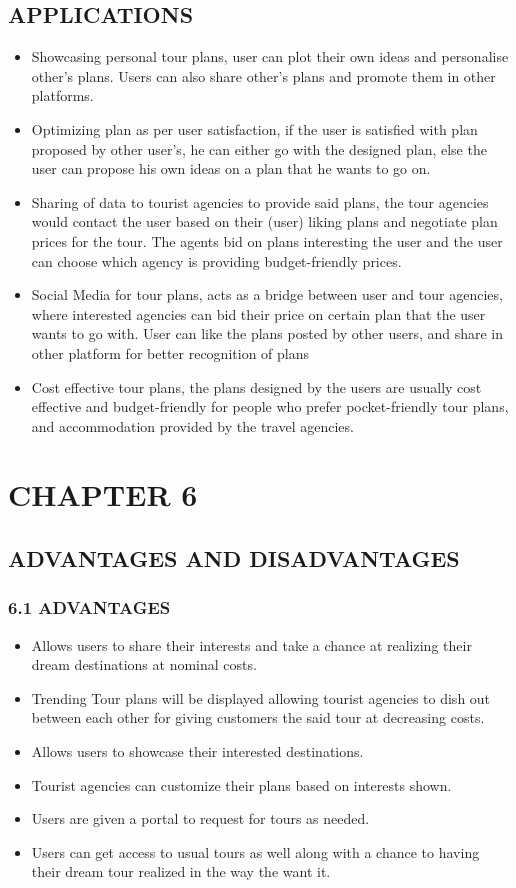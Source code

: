 \documentclass[12pt,a4paper]{article}
\begin{document}
\subsection*{\protect \centering APPLICATIONS}
\begin{itemize}
	\item Showcasing personal tour plans, user can plot their own ideas and personalise
	other’s plans. Users can also share other’s plans and promote them in other platforms.
	\item Optimizing plan as per user satisfaction, if the user is satisfied with plan proposed
	by other user’s, he can either go with the designed plan, else the user can propose his
	own ideas on a plan that he wants to go on.
	\item Sharing of data to tourist agencies to provide said plans, the tour agencies would
	contact the user based on their (user) liking plans and negotiate plan prices for the
	tour. The agents bid on plans interesting the user and the user can choose which
	agency is providing budget-friendly prices.
	\item Social Media for tour plans, acts as a bridge between user and tour agencies, where
	interested agencies can bid their price on certain plan that the user wants to go with.
	User can like the plans posted by other users, and share in other platform for better
	recognition of plans
	\item Cost effective tour plans, the plans designed by the users are usually cost effective
	and budget-friendly for people who prefer pocket-friendly tour plans, and
	accommodation provided by the travel agencies.
\end{itemize}

\newpage
\section*{CHAPTER 6 }
\subsection*{\protect \centering ADVANTAGES AND DISADVANTAGES}
\subsubsection*{6.1 ADVANTAGES}
\begin{itemize}
\item Allows users to share their interests and take a chance at realizing their dream
destinations at nominal costs.
\item Trending Tour plans will be displayed allowing tourist agencies to dish out between
each other for giving customers the said tour at decreasing costs.
\item Allows users to showcase their interested destinations.
\item Tourist agencies can customize their plans based on interests shown.
\item Users are given a portal to request for tours as needed.
\item Users can get access to usual tours as well along with a chance to having their dream
tour realized in the way the want it.
\end{itemize}
\end{document}
